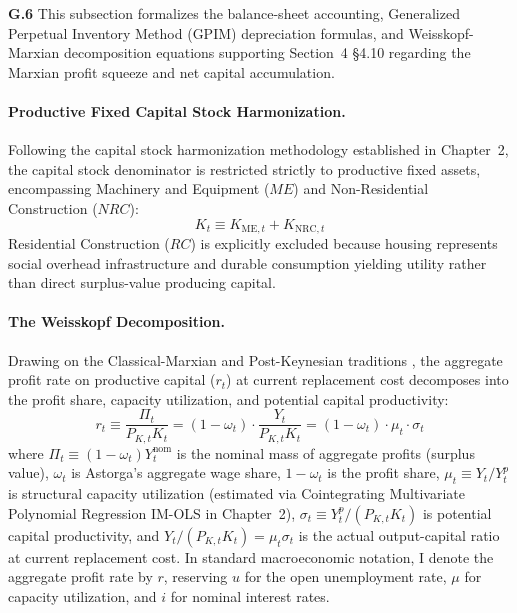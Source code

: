 \textbf{G.6} This subsection formalizes the balance-sheet accounting, Generalized Perpetual Inventory Method (GPIM) depreciation formulas, and Weisskopf-Marxian decomposition equations supporting Section~4 §4.10 regarding the Marxian profit squeeze and net capital accumulation.

\paragraph{Productive Fixed Capital Stock Harmonization.}
Following the capital stock harmonization methodology established in Chapter~2, the capital stock denominator is restricted strictly to productive fixed assets, encompassing Machinery and Equipment ($ME$) and Non-Residential Construction ($NRC$):
\begin{equation}
	K_t \equiv K_{\text{ME}, t} + K_{\text{NRC}, t}
	\label{eq:k_definition_app}
\end{equation}
Residential Construction ($RC$) is explicitly excluded because housing represents social overhead infrastructure and durable consumption yielding utility rather than direct surplus-value producing capital.

\paragraph{The Weisskopf Decomposition.}
Drawing on the Classical-Marxian and Post-Keynesian traditions \citep{Weisskopf1979,Foley1982,Basu2022}, the aggregate profit rate on productive capital ($r_t$) at current replacement cost decomposes into the profit share, capacity utilization, and potential capital productivity:
\begin{equation}
	r_t \equiv \frac{\Pi_t}{P_{K, t} K_t} = (1 - \omega_t) \cdot \frac{Y_t}{P_{K, t} K_t} = (1 - \omega_t) \cdot \mu_t \cdot \sigma_t
	\label{eq:profit_rate_weisskopf_app}
\end{equation}
where $\Pi_t \equiv (1 - \omega_t) Y^{\text{nom}}_t$ is the nominal mass of aggregate profits (surplus value), $\omega_t$ is Astorga's \citeyearpar{Astorga2023} aggregate wage share, $1 - \omega_t$ is the profit share, $\mu_t \equiv Y_t / Y^p_t$ is structural capacity utilization (estimated via Cointegrating Multivariate Polynomial Regression IM-OLS in Chapter~2), $\sigma_t \equiv Y^p_t / (P_{K, t} K_t)$ is potential capital productivity, and $Y_t / (P_{K, t} K_t) = \mu_t \sigma_t$ is the actual output-capital ratio at current replacement cost. In standard macroeconomic notation, I denote the aggregate profit rate by $r$, reserving $u$ for the open unemployment rate, $\mu$ for capacity utilization, and $i$ for nominal interest rates.

